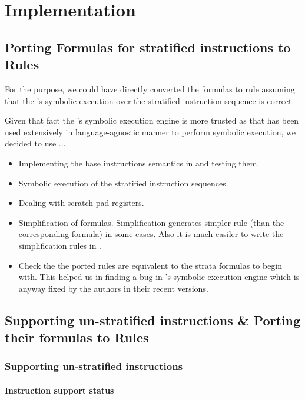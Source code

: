 \section{Implementation}

\subsection{Porting Formulas for stratified instructions to \K Rules}

For the purpose, we could have directly converted the \Strata formulas
to \K rule assuming that the \Strata's symbolic execution over the 
stratified instruction sequence is correct.

Given that fact the \K's symbolic execution engine is more trusted as 
that has been used extensively in language-agnostic manner to perform symbolic
execution, we decided to use ... 

\begin{itemize}
\item Implementing the base instructions semantics in \K and testing them.
\item Symbolic execution of the stratified instruction sequences.
\item Dealing with scratch pad registers.
\item Simplification of formulas.
  Simplification generates simpler \K rule (than the corresponding \Strata formula)
  in some cases. Also it is much easiler to write the simplification rules in
  \K.

\item Check the the ported \K rules are equivalent to the strata formulas to
begin with. This helped us in finding a bug in \Strata's symbolic execution 
engine which is anyway fixed by the authors in their recent versions.

\end{itemize}

\subsection{Supporting un-stratified instructions \& Porting their formulas to \K Rules}

\subsubsection{Supporting un-stratified instructions}
\paragraph{Instruction support status}

